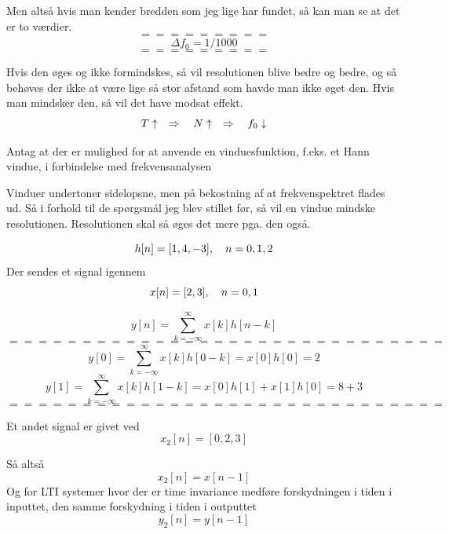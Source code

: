 \begin{EksamensOpgaver}
\begin{Eksamenssæt}[2021 - Rettet]
\begin{eksamensOpgave}
\begin{UnderOpgave}
                Men altså hvis man kender bredden som jeg lige har fundet, så kan man se at det er to værdier. 
                \[=========\]
                \[\Delta f_0 = 1/1000\]
                \[=========\]
            \end{UnderOpgave}
            \begin{UnderOpgave}
                Hvis den øges og ikke formindskes, så vil resolutionen blive bedre og bedre, og så behøves der ikke at være lige så stor afstand som havde man ikke øget den. 
                Hvis man mindsker den, så vil det have modsat effekt. 
                \[T \uparrow \tab{0} \Rightarrow \tab{0} N \uparrow \tab{0} \Rightarrow \tab{0} f_0\downarrow\]           
            \end{UnderOpgave}
            Antag at der er mulighed for at anvende en vinduesfunktion, f.eks. et Hann vindue, i forbindelse med frekvensanalysen
            \begin{UnderOpgave}
                Vinduer undertoner sidelopsne, men på bekostning af at frekvenspektret flades ud. 
                Så i forhold til de spørgsmål jeg blev stillet før, så vil en vindue mindske resolutionen. Resolutionen skal så øges det mere pga. den også.
            \end{UnderOpgave}
            
        \end{eksamensOpgave}
    \end{Eksamenssæt}
    \begin{Eksamenssæt}[2022]
        \begin{eksamensOpgave}
        \[h[n] = [1, 4, -3], \tab{0} n = 0, 1, 2\]
        Der sendes et signal igennem
        \[x[n] = [2, 3], \tab{0} n = 0, 1\]
        \begin{UnderOpgave}[Beregn y0 og y1]

            \[y[n]=\sum_{k =-\infty}^{\infty}x[k]h[n-k]\]
            \[==============================\]
            \[y[0] = \sum_{k =-\infty}^{\infty}x[k]h[0-k] = x[0]h[0] = 2\]
            \[y[1] = \sum_{k =-\infty}^{\infty}x[k]h[1-k] = x[0]h[1] + x[1]h[0] = 8 + 3\]
            \[==============================\]            
        \end{UnderOpgave}
        Et andet signal er givet ved
        \[x_2[n] = [0, 2, 3]\]
        \begin{UnderOpgave}
            Så altså 
            \[x_2[n] = x[n - 1]\]
            Og for LTI systemer hvor der er time invariance medføre forskydningen i tiden i inputtet, den samme forskydning i tiden i outputtet
            \[y_2[n] = y[n - 1]\]
            

\end{UnderOpgave}
\end{eksamensOpgave}
\end{Eksamenssæt}
\end{EksamensOpgaver}
